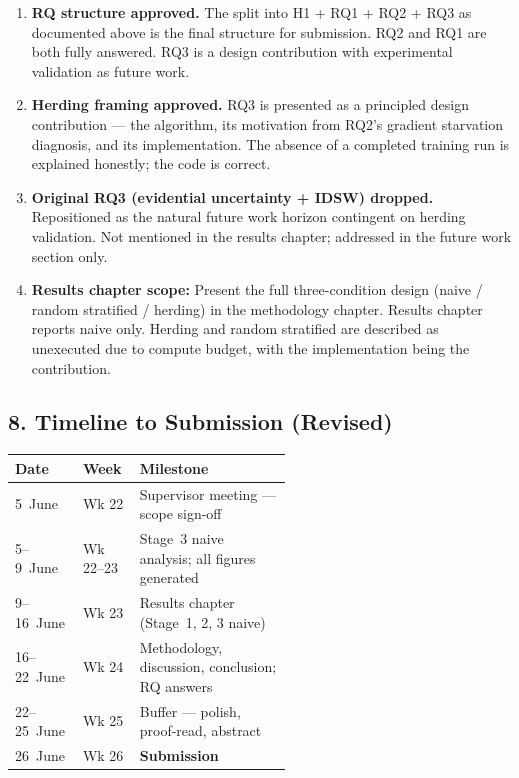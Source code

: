 \begin{enumerate}
    \item \textbf{RQ structure approved.} The split into H1 + RQ1 + RQ2 + RQ3
    as documented above is the final structure for submission. RQ2 and RQ1 are
    both fully answered. RQ3 is a design contribution with experimental
    validation as future work.

    \item \textbf{Herding framing approved.} RQ3 is presented as a principled
    design contribution — the algorithm, its motivation from RQ2's gradient
    starvation diagnosis, and its implementation. The absence of a completed
    training run is explained honestly; the code is correct.

    \item \textbf{Original RQ3 (evidential uncertainty + IDSW) dropped.}
    Repositioned as the natural future work horizon contingent on herding
    validation. Not mentioned in the results chapter; addressed in the
    future work section only.

    \item \textbf{Results chapter scope:} Present the full three-condition
    design (naive / random stratified / herding) in the methodology chapter.
    Results chapter reports naive only. Herding and random stratified are
    described as unexecuted due to compute budget, with the implementation
    being the contribution.
\end{enumerate}

\subsection*{8. Timeline to Submission (Revised)}

\begin{center}\small
\begin{tabular}{llp{0.55\linewidth}}
\hline
\textbf{Date} & \textbf{Week} & \textbf{Milestone} \\
\hline
5~June   & Wk 22 & Supervisor meeting — scope sign-off \\
5--9~June & Wk 22--23 & Stage~3 naive analysis; all figures generated \\
9--16~June & Wk 23 & Results chapter (Stage~1, 2, 3 naive) \\
16--22~June & Wk 24 & Methodology, discussion, conclusion; RQ answers \\
22--25~June & Wk 25 & Buffer — polish, proof-read, abstract \\
26~June  & Wk 26 & \textbf{Submission} \\
\hline
\end{tabular}
\end{center}

